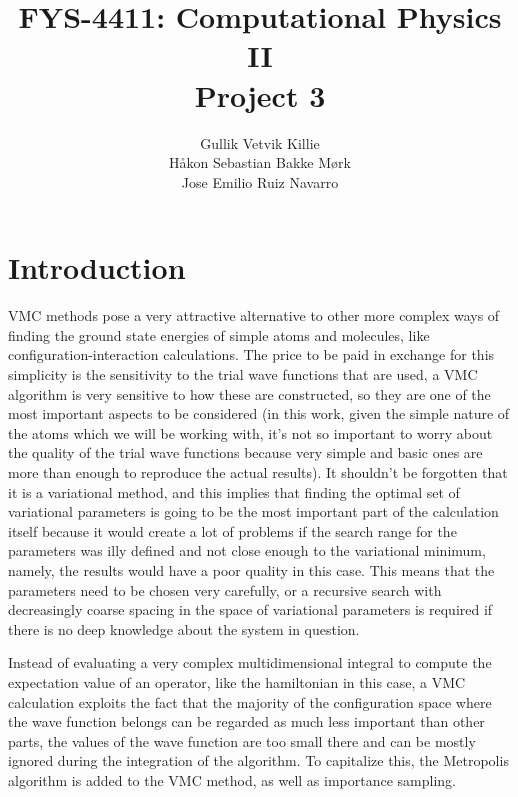 \documentclass[11pt]{article}
\title{ FYS-4411: Computational Physics II \\ Project 3 }
\author{Gullik Vetvik Killie\\
		Håkon Sebastian Bakke Mørk\\
		Jose Emilio Ruiz Navarro
		}
\begin{document}
\maketitle


\tableofcontents

\section{Introduction}
VMC methods pose a very attractive alternative to other more complex ways of finding the ground state energies of simple atoms and molecules, like configuration-interaction calculations. The price to be paid in exchange for this simplicity is the sensitivity to the trial wave functions that are used, a VMC algorithm is very sensitive to how these are constructed, so they are one of the most important aspects to be considered (in this work, given the simple nature of the atoms which we will be working with, it's not so important to worry about the quality of the trial wave functions because very simple and basic ones are more than enough to reproduce the actual results). It shouldn't be forgotten that it is a variational method, and this implies that finding the optimal set of variational parameters is going to be the most important part of the calculation itself because it would create a lot of problems if the search range for the parameters was illy defined and not close enough to the variational minimum, namely, the results would have a poor quality in this case. This means that the parameters need to be chosen very carefully, or a recursive search with decreasingly coarse spacing in the space of variational parameters is required if there is no deep knowledge about the system in question.

Instead of evaluating a very complex multidimensional integral to compute the expectation value of an operator, like the hamiltonian in this case, a VMC calculation exploits the fact that the majority of the configuration space where the wave function belongs can be regarded as much less important than other parts, the values of the wave function are too small there and can be mostly ignored during the integration of the algorithm. To capitalize this, the Metropolis algorithm is added to the VMC method, as well as importance sampling.
\end{document}
